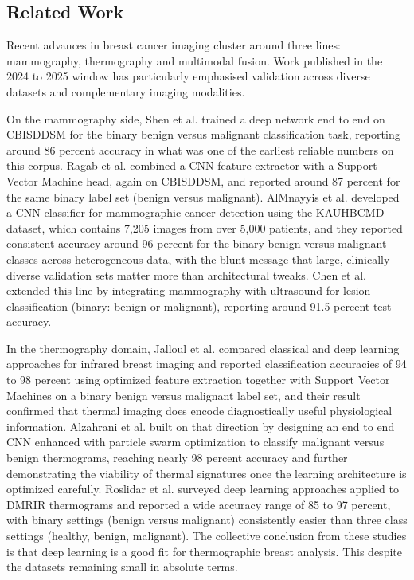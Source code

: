 \documentclass[lettersize,journal]{IEEEtran}
\begin{document}
\subsection{Related Work}

Recent advances in breast cancer imaging cluster around three lines: mammography, thermography and multimodal fusion. Work published in the 2024 to 2025 window has particularly emphasised validation across diverse datasets and complementary imaging modalities.

On the mammography side, Shen et al. \cite{Shen2019DeepLearningMammo} trained a deep network end to end on CBIS\textendash DDSM for the binary benign versus malignant classification task, reporting around 86 percent accuracy in what was one of the earliest reliable numbers on this corpus. Ragab et al. \cite{Ragab2019CBISDDSM} combined a CNN feature extractor with a Support Vector Machine head, again on CBIS\textendash DDSM, and reported around 87 percent for the same binary label set (benign versus malignant). Al\textendash Mnayyis et al. \cite{AlMnayyis2025} developed a CNN classifier for mammographic cancer detection using the KAUH\textendash BCMD dataset, which contains 7{,}205 images from over 5{,}000 patients, and they reported consistent accuracy around 96 percent for the binary benign versus malignant classes across heterogeneous data, with the blunt message that large, clinically diverse validation sets matter more than architectural tweaks. Chen et al. \cite{Chen2025multimodal} extended this line by integrating mammography with ultrasound for lesion classification (binary: benign or malignant), reporting around 91.5 percent test accuracy.

In the thermography domain, Jalloul et al. \cite{Jalloul2024} compared classical and deep learning approaches for infrared breast imaging and reported classification accuracies of 94 to 98 percent using optimized feature extraction together with Support Vector Machines on a binary benign versus malignant label set, and their result confirmed that thermal imaging does encode diagnostically useful physiological information. Alzahrani et al. \cite{Alzahrani2025} built on that direction by designing an end to end CNN enhanced with particle swarm optimization to classify malignant versus benign thermograms, reaching nearly 98 percent accuracy and further demonstrating the viability of thermal signatures once the learning architecture is optimized carefully. Roslidar et al. \cite{Roslidar2020} surveyed deep learning approaches applied to DMR\textendash IR thermograms and reported a wide accuracy range of 85 to 97 percent, with binary settings (benign versus malignant) consistently easier than three class settings (healthy, benign, malignant). The collective conclusion from these studies is that deep learning is a good fit for thermographic breast analysis. This despite the datasets remaining small in absolute terms.
\end{document}
